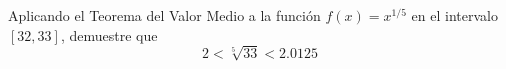 \item Aplicando el Teorema del Valor Medio a la función $f(x) = x^{1/5}$ en el intervalo $[32, 33]$, demuestre que $$2 < \sqrt[5]{33} < 2.0125$$
